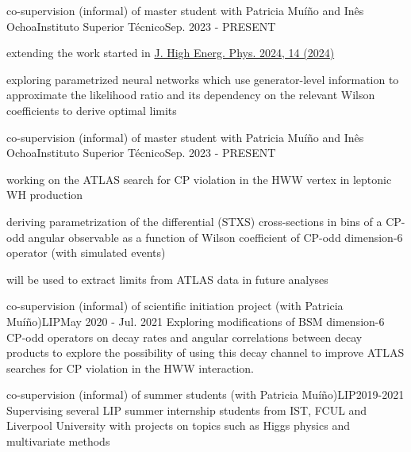 
\begin{cventries}
    {co-supervision (informal) of master student with Patricia Muíño and Inês Ochoa}{Instituto Superior Técnico}{Sep. 2023 - PRESENT}
    {
        \begin{cvitems}
            \item {extending the work started in \href{https://doi.org/10.1007/JHEP04(2024)014}{J. High Energ. Phys. 2024, 14 (2024)}}
            \item {exploring parametrized neural networks which use generator-level information to approximate the likelihood ratio and its dependency on the relevant Wilson coefficients to derive optimal limits}
        \end{cvitems}
    }\vspace*{2mm}

    {co-supervision (informal) of master student with Patricia Muíño and Inês Ochoa}{Instituto Superior Técnico}{Sep. 2023 - PRESENT}
    {
        \begin{cvitems}
            \item {working on the ATLAS search for CP violation in the HWW vertex in leptonic WH production}
            \item {deriving parametrization of the differential (STXS) cross-sections in bins of a CP-odd angular observable as a function of Wilson coefficient of CP-odd dimension-6 operator (with simulated events)}
            \item {will be used to extract limits from ATLAS data in future analyses}
        \end{cvitems}
    }
    
    {co-supervision (informal) of scientific initiation project (with Patricia Muíño)}{LIP}{May 2020 - Jul. 2021}
    {
        Exploring modifications of BSM dimension-6 CP-odd operators on decay rates and angular correlations between decay products to explore the possibility of using this decay channel to improve ATLAS searches for CP violation in the HWW interaction.
    }

    {co-supervision (informal) of summer students (with Patricia Muíño)}{LIP}{2019-2021}
    {Supervising several LIP summer internship students from IST, FCUL and Liverpool University with projects on topics such as Higgs physics and multivariate methods}

\end{cventries}